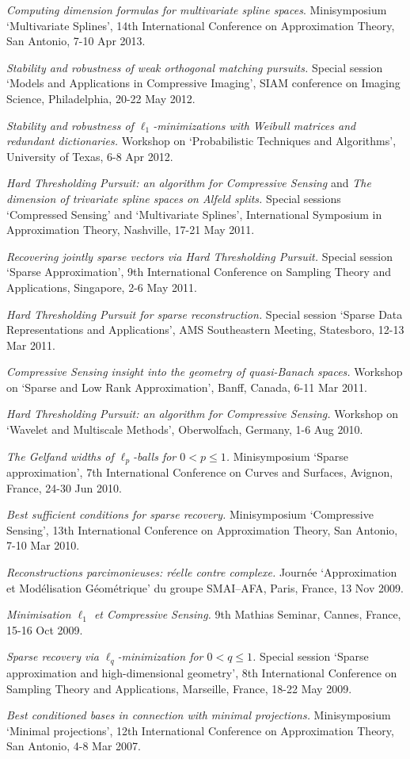 \documentclass[11pt]{article}
\begin{document}
\item {\sl Computing dimension formulas for multivariate spline spaces}.
Minisymposium `Multivariate Splines',
14th International Conference on Approximation Theory, San Antonio, 7-10 Apr 2013.
\item  {\sl Stability and robustness of weak orthogonal matching pursuits.}
Special session `Models and \mbox{Applications} in Compressive Imaging', SIAM conference on Imaging Science, Philadelphia, 20-22 May 2012.
\item {\sl Stability and robustness of $\ell_1$-minimizations with Weibull matrices and redundant dictionaries.}
Workshop on `Probabilistic Techniques and Algorithms', University of Texas, 6-8 Apr 2012.
\item {\sl Hard Thresholding Pursuit: an algorithm for Compressive Sensing} and {\sl The dimension of trivariate spline spaces on Alfeld splits.}
Special sessions `Compressed Sensing' and `Multivariate Splines', International Symposium in Approximation Theory, Nashville, 17-21 May 2011.
\item {\sl Recovering jointly sparse vectors via Hard Thresholding Pursuit.} 
Special session `Sparse Approximation', 9th International Conference on Sampling Theory and Applications, Singapore, 2-6 May 2011.
\item {\sl Hard Thresholding Pursuit for sparse reconstruction.}
Special session `Sparse Data Representations and Applications',  AMS  Southeastern Meeting, Statesboro, 12-13 Mar 2011.
\item {\sl Compressive Sensing insight into the geometry of quasi-Banach spaces.}
Workshop on `Sparse and Low Rank Approximation', Banff, Canada, 6-11 Mar 2011.
\item {\sl Hard Thresholding Pursuit: an algorithm for Compressive Sensing.}
Workshop on `Wavelet and \mbox{Multiscale} Methods', Oberwolfach, Germany, 1-6 Aug 2010.
\item {\sl The Gelfand widths of $\ell_p$-balls for $0<p\leq 1$.}
Minisymposium `Sparse approximation', 7th \mbox{International} Conference on Curves and Surfaces, Avignon, France, 24-30 Jun 2010.
\item {\sl Best sufficient conditions for sparse recovery.}
Minisymposium `Compressive Sensing', 13th \mbox{International} Conference on Approximation Theory, San Antonio, 7-10 Mar  2010.
\item {\sl Reconstructions parcimonieuses: r\'eelle contre complexe.} Journ\'ee `Approximation et Mod\'elisation G\'eom\'etrique' du groupe SMAI--AFA,
Paris, France, 13 Nov 2009.
\item {\sl Minimisation $\ell_1$ et Compressive Sensing.} 9th Mathias Seminar, Cannes, France, 15-16 Oct 2009.
\item {\sl Sparse recovery via $\ell_q$-minimization for $0<q \le 1$.} 
Special session `Sparse approximation and high-dimensional geometry',
8th International Conference on Sampling Theory and Applications, Marseille, France, 18-22 May 2009.
\item {\sl Best conditioned bases in connection with minimal projections.}
Minisymposium `Minimal projections', 12th International Conference on Approximation Theory, San Antonio, 4-8 Mar 2007.
\eitemize
\end{document}
